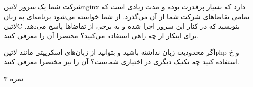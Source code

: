 \documentclass[../main.tex]{subfiles}
\begin{document}

شرکت شما یک سرور ‌لاتین{nginx} دارد که بسیار پرقدرت بوده و مدت زیادی است که تمامی تقاضاهای شرکت شما از آن می‌گذرد. از شما خواسته می‌شود برنامه‌ای به زبان ‌لاتین{C} بنویسید که در کنار این سرور اجرا شده و به برخی از تقاضاها پاسخ می‌دهد. برای اینکار از چه راهی استفاده می‌کنید؟ مختصرا آن را معرفی کنید.

اگر محدودیت زبان نداشته باشید و بتوانید از زبان‌های اسکریپتی مانند ‌لاتین{php} و ‌خ استفاده کنید چه تکنیک دیگری در اختیاری شماست؟ آن را نیز مختصرا معرفی کنید.

۳ نمره
\end{document}
